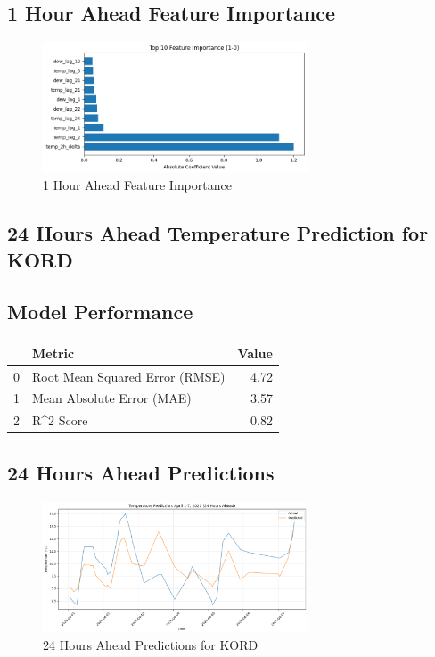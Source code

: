 \subsection{1 Hour Ahead Feature Importance}
\begin{figure}[htbp]
\centering
\includegraphics[width=0.7\textwidth]{1-0-linear_temp_shift_feature_importance.png}
\caption{1 Hour Ahead Feature Importance}
\label{fig:1_hour_ahead_featimp}
\end{figure}



\subsection{24 Hours Ahead Temperature Prediction for KORD}
\subsection{Model Performance}
\begin{tabular}{llr}
\toprule
 & Metric & Value \\
\midrule
0 & Root Mean Squared Error (RMSE) & 4.72 \\
1 & Mean Absolute Error (MAE) & 3.57 \\
2 & R^2 Score & 0.82 \\
\bottomrule
\end{tabular}

\subsection{24 Hours Ahead Predictions}
\begin{figure}[htbp]
\centering
\includegraphics[width=0.7\textwidth]{1-1-linear_temp_shift_results.png}
\caption{24 Hours Ahead Predictions for KORD}
\label{fig:24_hours_ahead_pred}
\end{figure}

